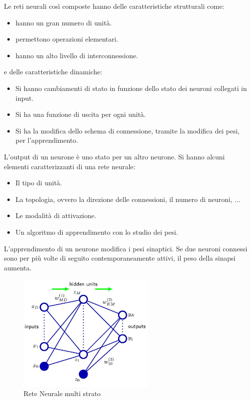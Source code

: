 Le reti neurali così composte hanno delle caratteristiche strutturali come:
\begin{itemize}
    \item hanno un gran numero di unità.
    \item permettono operazioni elementari.
    \item hanno un alto livello di interconnessione.
\end{itemize}
e delle caratteristiche dinamiche:
\begin{itemize}
    \item Si hanno cambiamenti di stato in funzione dello stato dei neuroni collegati
          in input.
    \item Si ha una funzione di uscita per ogni unità.
    \item Si ha la modifica dello schema di connessione, tramite la modifica dei
          pesi, per l'apprendimento.
\end{itemize}

L'output di un neurone è uno stato per un altro neurone. Si hanno alcuni elementi
caratterizzanti di una rete neurale:
\begin{itemize}
    \item Il tipo di unità.
    \item La topologia, ovvero la direzione delle connessioni, il numero di neuroni, $\dots$
    \item Le modalità di attivazione.
    \item Un algoritmo di apprendimento con lo studio dei pesi.
\end{itemize}

L'apprendimento di un neurone modifica i pesi sinaptici. Se due neuroni connessi
sono per più volte di seguito contemporaneamente attivi, il peso della sinapsi aumenta.
\begin{figure}[!ht]
    \centering
    \includegraphics[width=0.6\textwidth]{img/reti/rete.png}
    \caption{Rete Neurale multi strato}
\end{figure}

